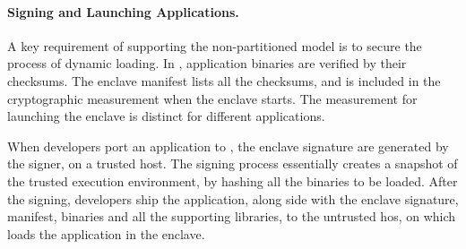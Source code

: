 
\paragraph{Signing and Launching Applications.}
A key requirement of supporting the non-partitioned model is to secure the process of dynamic loading.
In \sysname{}, application binaries are verified by their checksums.
The enclave manifest lists all the checksums,
and is included in the cryptographic measurement when the enclave starts.
The measurement for launching the enclave is distinct
for different applications.

When developers port an application to \sysname{},
the enclave signature are generated by the \sysname{} signer,
on a trusted host.
The signing process essentially creates a snapshot of
the trusted execution environment,
by hashing all the binaries to be loaded.
After the signing, developers ship the application, along side with the enclave signature, manifest, \sysname{} binaries and all the supporting libraries,
to the untrusted hos,
on which \sysname{} loads the application in the enclave.


